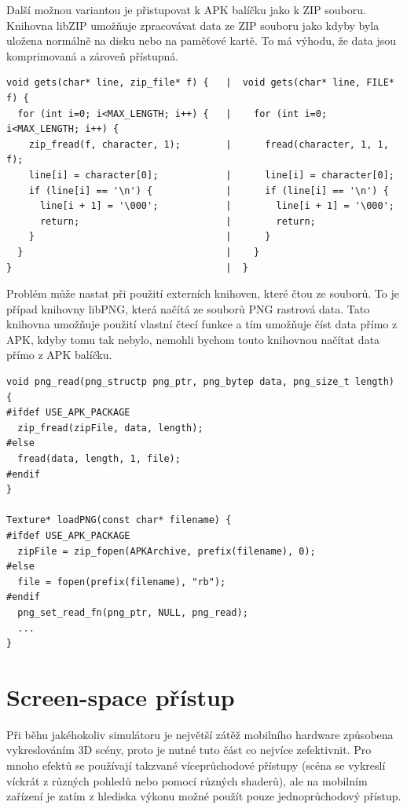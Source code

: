 \documentclass[11pt,twoside,a4paper]{book}
\begin{document}
Další možnou variantou je přistupovat k APK balíčku jako k ZIP souboru. Knihovna libZIP umožňuje zpracovávat data ze ZIP souboru jako kdyby byla uložena normálně na disku nebo na paměťové kartě. To má výhodu, že data jsou komprimovaná a zároveň přístupná.
\lstset{language=C++} 
\begin{lstlisting}[caption=Čtení řádky z APK balíčku (vlevo) a ze souboru (vpravo)]
void gets(char* line, zip_file* f) {   |  void gets(char* line, FILE* f) {
  for (int i=0; i<MAX_LENGTH; i++) {   |    for (int i=0; i<MAX_LENGTH; i++) {
    zip_fread(f, character, 1);        |      fread(character, 1, 1, f);
    line[i] = character[0];            |      line[i] = character[0];
    if (line[i] == '\n') {             |      if (line[i] == '\n') {
      line[i + 1] = '\000';            |        line[i + 1] = '\000';
      return;                          |        return;
    }                                  |      }  
  }                                    |    }      
}                                      |  }   
\end{lstlisting}

Problém může nastat při použití externích knihoven, které čtou ze souborů. To je případ knihovny libPNG, která načítá ze souborů PNG rastrová data. Tato knihovna umožňuje použití vlastní čtecí funkce a tím umožňuje číst data přímo z APK, kdyby tomu tak nebylo, nemohli bychom touto knihovnou načítat data přímo z APK balíčku.

\lstset{language=C++} 
\begin{lstlisting}[caption=Použití vlastní čtecí funkce při použití knihovny libPNG]
void png_read(png_structp png_ptr, png_bytep data, png_size_t length) {
#ifdef USE_APK_PACKAGE
  zip_fread(zipFile, data, length);
#else
  fread(data, length, 1, file);
#endif
}

Texture* loadPNG(const char* filename) {
#ifdef USE_APK_PACKAGE
  zipFile = zip_fopen(APKArchive, prefix(filename), 0);
#else
  file = fopen(prefix(filename), "rb");
#endif
  png_set_read_fn(png_ptr, NULL, png_read);
  ...
}
\end{lstlisting}

\section{Screen-space přístup}
Při běhu jakéhokoliv simulátoru je největší zátěž mobilního hardware způsobena vykreslováním 3D scény, proto je nutné tuto část co nejvíce zefektivnit. Pro mnoho efektů se používají takzvané víceprůchodové přístupy (scéna se vykreslí víckrát z různých pohledů nebo pomocí různých shaderů), ale na mobilním zařízení je zatím z hlediska výkonu možné použít pouze jednoprůchodový přístup.
\end{document}
